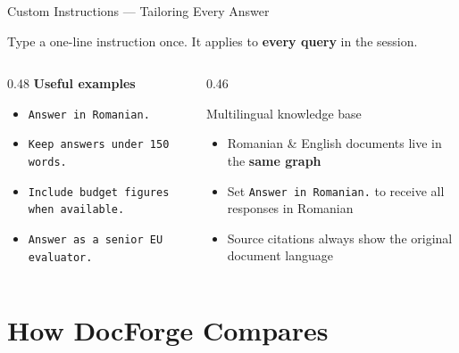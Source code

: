 \documentclass[aspectratio=169,11pt]{beamer}
\begin{document}
\begin{frame}{Custom Instructions — Tailoring Every Answer}
  \vspace{0.3cm}
  \begin{center}
    \small Type a one-line instruction once.
    It applies to \textbf{every query} in the session.
  \end{center}
  \bigskip
  \begin{columns}[t]
    \begin{column}{0.48\textwidth}
      \textbf{Useful examples}\\[8pt]
      \begin{itemize}\setlength\itemsep{8pt}
        \item \texttt{Answer in Romanian.}
        \item \texttt{Keep answers under 150 words.}
        \item \texttt{Include budget figures when available.}
        \item \texttt{Answer as a senior EU evaluator.}
      \end{itemize}
    \end{column}
    \begin{column}{0.46\textwidth}
      \begin{block}{Multilingual knowledge base}
        \begin{itemize}\setlength\itemsep{7pt}
          \item Romanian \& English documents
                live in the \textbf{same graph}
          \item Set \texttt{Answer in Romanian.}
                to receive all responses in Romanian
          \item Source citations always show the
                original document language
        \end{itemize}
      \end{block}
    \end{column}
  \end{columns}
\end{frame}

\section{How DocForge Compares}
\end{document}
